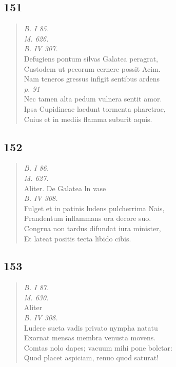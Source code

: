 \documentclass[11pt, a4paper]{report}
\begin{document}
            \subsection*{151}
      \begin{verse}
      \textit{B. I 85.} \\ \textit{M. 626.} \\ \textit{B. IV 307.} \\ Defugiens pontum silvas Galatea peragrat, \\ Custodem ut pecorum cernere possit Acim. \\ Nam teneros gressus infigit sentibus ardens \\ \textit{p. 91} \\ Nec tamen alta pedum vulnera sentit amor. \\ Ipsa Cupidineae laedunt tormenta pharetrae, \\ Cuius et in mediis flamma suburit aquis. \\ 
      \end{verse}
  
            \subsection*{152}
      \begin{verse}
      \textit{B. I 86.} \\ \textit{M. 627.} \\ Aliter. De Galatea ln vase \\ \textit{B. IV 308.} \\ Fulget et in patinis ludens pulcherrima Nais, \\ Prandentum inflammans ora decore suo. \\ Congrua non tardus difundat iura minister, \\ Et lateat positis tecta libido cibis. \\ 
      \end{verse}
  
            \subsection*{153}
      \begin{verse}
      \textit{B. I 87.} \\ \textit{M. 630.} \\ Aliter \\ \textit{B. IV 308.} \\ Ludere sueta vadis privato nympha natatu \\ Exornat mensas membra venusta movens. \\ Comtas nolo dapes; vacuum mihi pone boletar: \\ Quod placet aspiciam, renuo quod saturat! \\ 
      \end{verse}
  
\end{document}
